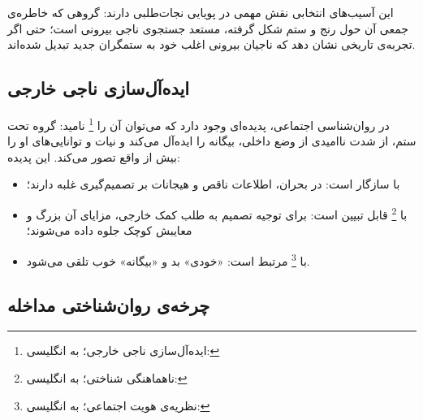 این آسیب‌های انتخابی نقش مهمی در پویایی نجات‌طلبی دارند:
گروهی که خاطره‌ی جمعی آن حول رنج و ستم شکل گرفته، مستعد
جستجوی ناجی بیرونی است؛ حتی اگر تجربه‌ی تاریخی نشان دهد
که ناجیان بیرونی اغلب خود به ستمگران جدید تبدیل شده‌اند.

\subsection{ایده‌آل‌سازی ناجی خارجی}
\label{subsec:ch04-idealization}

\begin{tcolorbox}[defbox,
title={مفهوم: ایده‌آل‌سازی ناجی خارجی}]
در روان‌شناسی اجتماعی، پدیده‌ای وجود دارد که می‌توان آن را
%
\footnote{ایده‌آل‌سازی ناجی خارجی؛ به انگلیسی:
}%
نامید: گروه تحت ستم، از شدت ناامیدی از وضع داخلی، بیگانه
را ایده‌آل می‌کند و نیات و توانایی‌های او را بیش از واقع تصور
می‌کند. این پدیده:
\begin{itemize}[nosep, rightmargin=1em]
\item با  سازگار است: در بحران،
اطلاعات ناقص و هیجانات بر تصمیم‌گیری غلبه
دارند؛
\item با %
\footnote{ناهماهنگی شناختی؛ به انگلیسی:
	}
قابل تبیین است: برای توجیه تصمیم به طلب کمک خارجی، مزایای
آن بزرگ و معایبش کوچک جلوه داده
می‌شوند؛
\item با %
\footnote{نظریه‌ی هویت اجتماعی؛ به انگلیسی:
	}
مرتبط است: «خودی» بد و «بیگانه» خوب تلقی
می‌شود.
\end{itemize}
\end{tcolorbox}

\subsection{چرخه‌ی روان‌شناختی مداخله}
\label{subsec:ch04-psych-cycle}

